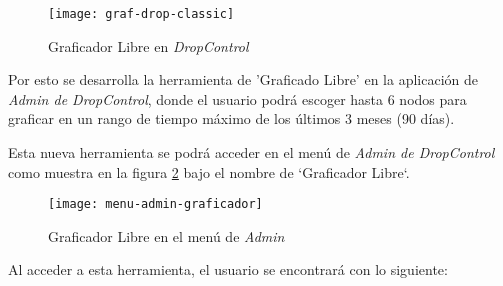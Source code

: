 \begin{figure}[H]
	\centering
	\texttt{[image: graf-drop-classic]}
	\caption{\label{fig:graf-drop-classic} Graficador Libre en \textit{DropControl}}
\end{figure}

Por esto se desarrolla la herramienta de 'Graficado Libre' en la aplicación de \textit{Admin de DropControl},
donde el usuario podrá escoger hasta 6 nodos para graficar en un rango de tiempo máximo de los últimos 3 meses (90 días).

Esta nueva herramienta se podrá acceder en el menú de \textit{Admin de DropControl} como muestra en la figura \ref{fig:menu-admin-graf1} bajo el nombre de `Graficador Libre`. 

\begin{figure}[H]
	\centering
	\texttt{[image: menu-admin-graficador]}
	\caption{\label{fig:menu-admin-graf1} Graficador Libre en el menú de \textit{Admin}}
\end{figure}

Al acceder a esta herramienta, el usuario se encontrará con lo siguiente:

